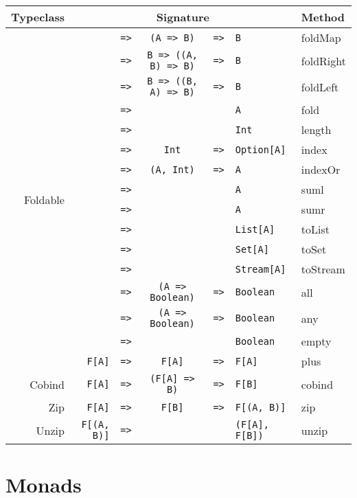 \documentclass{tufte-handout}
\newcommand{\fa}{F[A]}
\newcommand{\fb}{F[B]}
\newcommand{\rarr}{\texttt{=>}}
\newcommand{\fTwo}[2]{\texttt{#1} & \rarr & & & \texttt{#2}}
\newcommand{\fThree}[3]{\texttt{#1} & \rarr & \texttt{#2} & \rarr & \texttt{#3}}
\begin{document}
\begin{table}[ht]
  \centering
  \selectfont
  \begin{tabular}{rrcclll}
    Typeclass & \multicolumn{5}{c}{Signature} & Method \\
    \midrule
    \multirow{16}{*}{Foldable}
      & \fThree{\multirow{16}{*}{\fa}}{(A => B)}{B} & foldMap \\
      & \fThree{}{B => ((A, B) => B)}{B} & foldRight \\
      & \fThree{}{B => ((B, A) => B)}{B} & foldLeft \\
      & \fTwo{}{A} & fold \\
      & \fTwo{}{Int} & length \\
      & \fThree{}{Int}{Option[A]} & index \\
      & \fThree{}{(A, Int)}{A} & indexOr \\
      & \fTwo{}{A} & suml \\
      & \fTwo{}{A} & sumr \\
      & \fTwo{}{List[A]} & toList \\
      & \fTwo{}{Set[A]} & toSet \\
      & \fTwo{}{Stream[A]} & toStream \\
      & \fThree{}{(A => Boolean)}{Boolean} & all \\
      & \fThree{}{(A => Boolean)}{Boolean} & any \\
      & \fTwo{}{Boolean} & empty \\[.5cm]
    Plus          & \fThree{\fa}{\fa}{\fa} & plus \\[.5cm]
    Cobind        & \fThree{\fa}{(F[A] => B)}{\fb} & cobind \\[.5cm]
    Zip           & \fThree{\fa}{\fb}{F[(A, B)]} & zip \\[.5cm]
    Unzip         & \fTwo{F[(A, B)]}{(F[A], F[B])} & unzip \\
  \end{tabular}
\end{table}


\section{Monads}\label{sec:monads}
\end{document}
